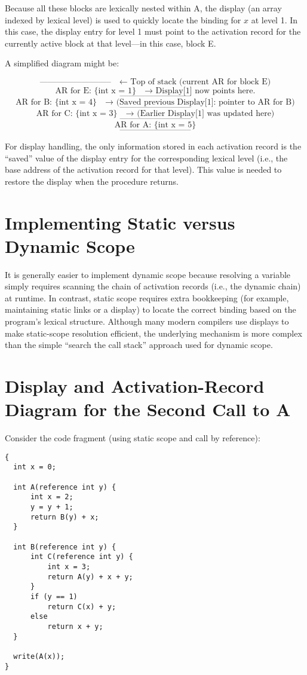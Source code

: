 \documentclass{article}
\begin{document}
Because all these blocks are lexically nested within A, the display (an array indexed by lexical level) is used to quickly locate the binding for \(x\) at level 1. In this case, the display entry for level 1 must point to the activation record for the currently active block at that level—in this case, block E.

A simplified diagram might be:

\[
\text{--------------------------} \quad \text{← Top of stack (current AR for block E)}
\]
\[
\text{AR for E: } \{ \text{int x = 1} \} \quad \text{→ Display[1] now points here.}
\]
\[
\text{--------------------------}
\]
\[
\text{AR for B: } \{ \text{int x = 4} \} \quad \text{→ (Saved previous Display[1]: pointer to AR for B)}
\]
\[
\text{--------------------------}
\]
\[
\text{AR for C: } \{ \text{int x = 3} \} \quad \text{→ (Earlier Display[1] was updated here)}
\]
\[
\text{--------------------------}
\]
\[
\text{AR for A: } \{ \text{int x = 5} \}
\]
\[
\text{--------------------------}
\]

For display handling, the only information stored in each activation record is the ``saved'' value of the display entry for the corresponding lexical level (i.e., the base address of the activation record for that level). This value is needed to restore the display when the procedure returns.

\section{Implementing Static versus Dynamic Scope}
It is generally easier to implement dynamic scope because resolving a variable simply requires scanning the chain of activation records (i.e., the dynamic chain) at runtime. In contrast, static scope requires extra bookkeeping (for example, maintaining static links or a display) to locate the correct binding based on the program's lexical structure. Although many modern compilers use displays to make static-scope resolution efficient, the underlying mechanism is more complex than the simple ``search the call stack'' approach used for dynamic scope.

\section{Display and Activation-Record Diagram for the Second Call to A}
Consider the code fragment (using static scope and call by reference):

\begin{verbatim}
{
  int x = 0;
  
  int A(reference int y) {
      int x = 2;
      y = y + 1;
      return B(y) + x;
  }
  
  int B(reference int y) {
      int C(reference int y) {
          int x = 3;
          return A(y) + x + y;
      }
      if (y == 1)
          return C(x) + y;
      else
          return x + y;
  }
  
  write(A(x));
}
\end{verbatim}
\end{document}

